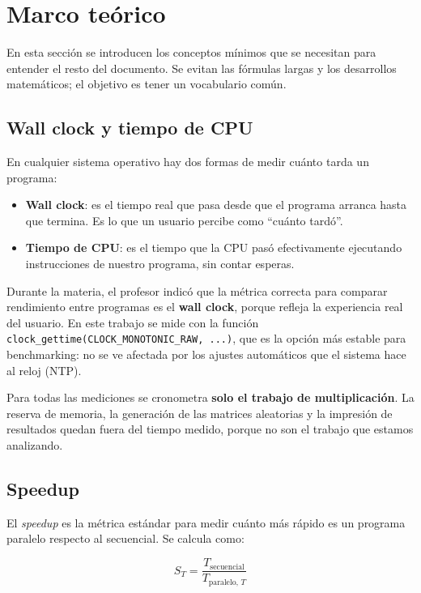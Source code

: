 \section{Marco teórico}

En esta sección se introducen los conceptos mínimos que se necesitan para entender el resto del documento. Se evitan las fórmulas largas y los desarrollos matemáticos; el objetivo es tener un vocabulario común.

\subsection{Wall clock y tiempo de CPU}

En cualquier sistema operativo hay dos formas de medir cuánto tarda un programa:

\begin{itemize}
    \item \textbf{Wall clock}: es el tiempo real que pasa desde que el programa arranca hasta que termina. Es lo que un usuario percibe como ``cuánto tardó''.
    \item \textbf{Tiempo de CPU}: es el tiempo que la CPU pasó efectivamente ejecutando instrucciones de nuestro programa, sin contar esperas.
\end{itemize}

Durante la materia, el profesor indicó que la métrica correcta para comparar rendimiento entre programas es el \textbf{wall clock}, porque refleja la experiencia real del usuario. En este trabajo se mide con la función \texttt{clock\_gettime(CLOCK\_MONOTONIC\_RAW, ...)}, que es la opción más estable para benchmarking: no se ve afectada por los ajustes automáticos que el sistema hace al reloj (NTP).

Para todas las mediciones se cronometra \textbf{solo el trabajo de multiplicación}. La reserva de memoria, la generación de las matrices aleatorias y la impresión de resultados quedan fuera del tiempo medido, porque no son el trabajo que estamos analizando.

\subsection{Speedup}

El \textit{speedup} es la métrica estándar para medir cuánto más rápido es un programa paralelo respecto al secuencial. Se calcula como:

\[
S_T = \frac{T_{\text{secuencial}}}{T_{\text{paralelo},\,T}}
\]

